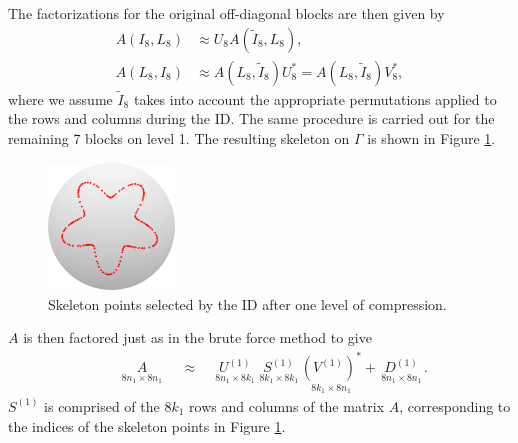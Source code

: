 \documentclass{sfuthesis}
\begin{document}
The factorizations for the original off-diagonal blocks are then given by
\begin{align*}
	A(I_8, L_8)&\approx U_8 A(\tilde{I}_8, L_8),\\
	A(L_8, I_8)&\approx A(L_8, \tilde{I}_8)U_8^* = A(L_8, \tilde{I}_8)V_8^*,
\end{align*}
where we assume $\tilde{I}_8$ takes into account the appropriate permutations applied to the rows and columns during the ID. 
The same procedure is carried out for the remaining 7 blocks on level 1. The resulting skeleton on $\Gamma$ is shown in Figure \ref{fig: ProxyRecLev1SkelAll}. 
\begin{figure}[h]
	\centering
	\includegraphics[width=0.3\textwidth]{ProxyRecLev1SkelAll}
	\caption{Skeleton points selected by the ID after one level of compression. }
	\label{fig: ProxyRecLev1SkelAll}
\end{figure}

$A$ is then factored just as in the brute force method to give 
\begin{align}
	& \underset{8n_1 \times 8n_1}{\hspace{1cm} A \hspace{1cm} }\approx \quad \underset{ \ 8n_1 \times 8k_1 \ }{U^{(1)}}  \underset{ \ 8k_1 \times 8k_1 \ }{S^{(1)}} \underset{ \ 8k_1 \times 8n_1 \ }{{(V^{(1)})}^*}+\underset{ \ 8n_1 \times 8n_1 \ }{D^{(1)}}. \label{eq: ProxyRecLev1Factorization} 
\end{align}
$S^{(1)}$ is comprised of the $8k_1$ rows and columns of the matrix $A$, corresponding to the indices of the skeleton points in Figure \ref{fig: ProxyRecLev1SkelAll}. 

\end{document}
